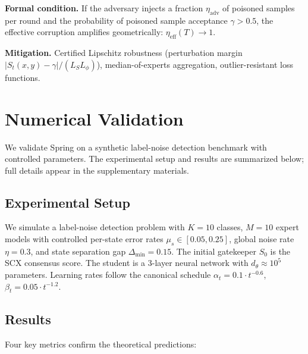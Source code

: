 \documentclass[11pt,a4paper]{article}
\theoremstyle{plain}
\theoremstyle{definition}
\theoremstyle{remark}
\begin{document}
\textbf{Formal condition.} If the adversary injects a fraction $\eta_{\text{adv}}$ of poisoned samples per round and the probability of poisoned sample acceptance $\gamma > 0.5$, the effective corruption amplifies geometrically: $\eta_{\text{eff}}(T) \to 1$.

\textbf{Mitigation.} Certified Lipschitz robustness (perturbation margin $|S_t(x,y) - \gamma|/(L_S L_\phi)$), median-of-experts aggregation, outlier-resistant loss functions.

\section{Numerical Validation}

We validate Spring on a synthetic label-noise detection benchmark with controlled parameters. The experimental setup and results are summarized below; full details appear in the supplementary materials.

\subsection{Experimental Setup}

We simulate a label-noise detection problem with $K = 10$ classes, $M = 10$ expert models with controlled per-state error rates $\mu_s \in [0.05, 0.25]$, global noise rate $\eta = 0.3$, and state separation gap $\Delta_{\min} = 0.15$. The initial gatekeeper $S_0$ is the SCX consensus score. The student is a 3-layer neural network with $d_\theta \approx 10^5$ parameters. Learning rates follow the canonical schedule $\alpha_t = 0.1 \cdot t^{-0.6}$, $\beta_t = 0.05 \cdot t^{-1.2}$.

\subsection{Results}

Four key metrics confirm the theoretical predictions:
\end{document}
